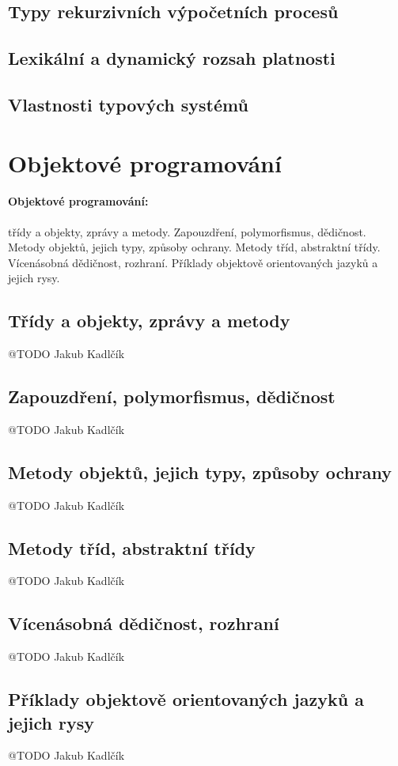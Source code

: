 \documentclass[10pt,a4paper]{article}
\begin{document}
  \subsection{Typy rekurzivních výpočetních procesů}
  \subsection{Lexikální a dynamický rozsah platnosti}
  \subsection{Vlastnosti typových systémů}



\newpage
\section{Objektové programování}
\paragraph{Objektové programování:} třídy a objekty, zprávy a metody. Zapouzdření, polymorfismus, dědičnost. Metody objektů, jejich typy, způsoby ochrany. Metody tříd, abstraktní třídy. Vícenásobná dědičnost, rozhraní. Příklady objektově orientovaných jazyků a jejich rysy.

\subsection{Třídy a objekty, zprávy a metody}
@TODO Jakub Kadlčík

\subsection{Zapouzdření, polymorfismus, dědičnost}
@TODO Jakub Kadlčík

\subsection{Metody objektů, jejich typy, způsoby ochrany}
@TODO Jakub Kadlčík

\subsection{Metody tříd, abstraktní třídy}
@TODO Jakub Kadlčík

\subsection{Vícenásobná dědičnost, rozhraní}
@TODO Jakub Kadlčík

\subsection{Příklady objektově orientovaných jazyků a jejich rysy}
@TODO Jakub Kadlčík



\end{document}
